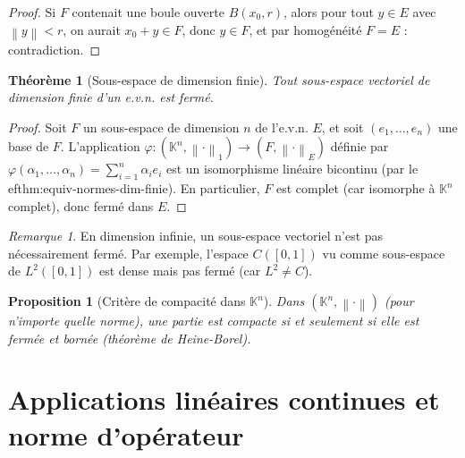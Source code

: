 \documentclass[a4paper,12pt]{book}
\newcommand{\K}{\mathbb{K}}
\newcommand{\norm}[1]{\left\| #1 \right\|}
\theoremstyle{definition}
\theoremstyle{plain}
\newtheorem{theoreme}[definition]{Théorème}
\newtheorem{proposition}[definition]{Proposition}
\theoremstyle{remark}
\newtheorem{remarque}[definition]{Remarque}
\begin{document}
\begin{proof}
Si $F$ contenait une boule ouverte $B(x_0, r)$, alors pour tout $y \in E$ avec $\norm{y} < r$, on aurait $x_0 + y \in F$, donc $y \in F$, et par homogénéité $F = E$ : contradiction.
\end{proof}

\begin{theoreme}[Sous-espace de dimension finie]\label{thm:dim-finie-ferme}
Tout sous-espace vectoriel de dimension finie d'un e.v.n. est fermé.
\end{theoreme}

\begin{proof}
Soit $F$ un sous-espace de dimension $n$ de l'e.v.n. $E$, et soit $(e_1, \ldots, e_n)$ une base de $F$. L'application $\varphi : (\K^n, \norm{\cdot}_1) \to (F, \norm{\cdot}_E)$ définie par $\varphi(\alpha_1, \ldots, \alpha_n) = \sum_{i=1}^n \alpha_i e_i$ est un isomorphisme linéaire bicontinu (par le 
ef{thm:equiv-normes-dim-finie}). En particulier, $F$ est complet (car isomorphe à $\K^n$ complet), donc fermé dans $E$.
\end{proof}

\begin{remarque}\label{rem:dim-infinie-non-ferme}
En dimension infinie, un sous-espace vectoriel n'est pas nécessairement fermé. Par exemple, l'espace $C([0,1])$ vu comme sous-espace de $L^2([0,1])$ est dense mais pas fermé (car $L^2 \neq C$).
\end{remarque}

\begin{proposition}[Critère de compacité dans $\K^n$]\label{prop:compacite-Kn}
\index{compacité!dans $\K^n$}
Dans $(\K^n, \norm{\cdot})$ (pour n'importe quelle norme), une partie est compacte si et seulement si elle est fermée et bornée (théorème de Heine-Borel).
\end{proposition}

\section{Applications linéaires continues et norme d'opérateur}
\end{document}
